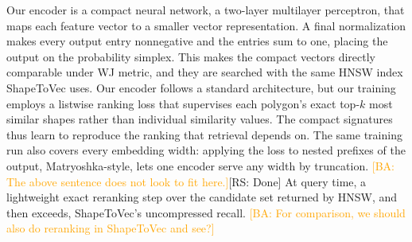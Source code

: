 \documentclass[conference]{IEEEtran}
\newcommand{\rs}[1]{\textcolor{green!55!black}{[RS: #1]}}
\newcommand{\ba}[1]{\textcolor{orange}{[BA: #1]}}
\begin{document}
Our encoder is a compact neural network, a two-layer multilayer perceptron, that
maps each feature vector to a smaller vector representation. A final
normalization makes every output entry nonnegative and the entries sum to one,
placing the output on the probability simplex. This makes the compact vectors
directly comparable under WJ metric, and they are searched with the same HNSW index
ShapeToVec uses.
Our encoder follows a standard architecture, but our
training employs
a listwise ranking loss that supervises each polygon's exact top-$k$ most similar
shapes rather than individual similarity values. The compact signatures thus learn
to reproduce the ranking that retrieval depends on. The same training run also
covers every embedding width: applying the loss to nested prefixes of the output,
Matryoshka-style, lets one encoder serve any width by truncation. \ba{The above sentence does not look to fit here.}\rs{Done} At query time, a lightweight exact reranking step over
the candidate set returned by HNSW, and then exceeds, ShapeToVec's
uncompressed recall. \ba{For comparison, we should also do reranking in ShapeToVec and see?}

\end{document}
